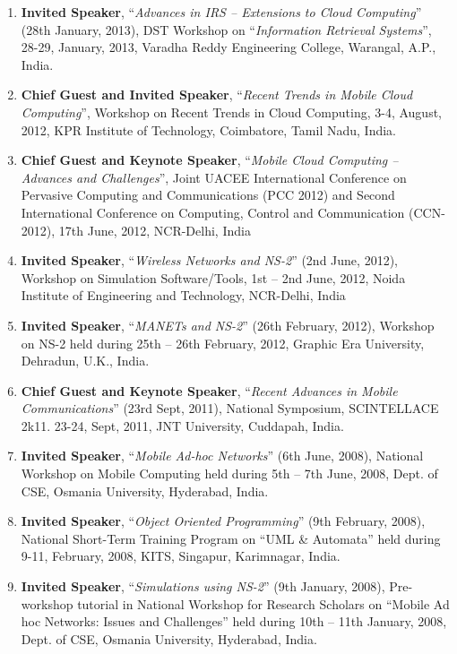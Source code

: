 \begin{enumerate}
\item
\textbf{Invited Speaker}, “\textit{Advances in IRS – Extensions to Cloud Computing}” (28th January, 2013), DST Workshop on “\textit{Information Retrieval Systems}”, 28-29, January, 2013, Varadha Reddy Engineering College, Warangal, A.P., India.

\item
\textbf{Chief Guest and Invited Speaker}, “\textit{Recent Trends in Mobile Cloud Computing}”, Workshop on Recent Trends in Cloud Computing, 3-4, August, 2012, KPR Institute of Technology, Coimbatore, Tamil Nadu, India.

\item
\textbf{Chief Guest and Keynote Speaker}, “\textit{Mobile Cloud Computing – Advances and Challenges}”, Joint UACEE International Conference on Pervasive Computing and Communications (PCC 2012) and Second International Conference on Computing, Control and Communication (CCN-2012), 17th June, 2012, NCR-Delhi, India

\item
\textbf{Invited Speaker}, “\textit{Wireless Networks and NS-2}” (2nd June, 2012), Workshop on Simulation Software/Tools, 1st – 2nd June, 2012, Noida Institute of Engineering and Technology, NCR-Delhi, India

\item
\textbf{Invited Speaker}, “\textit{MANETs and NS-2}” (26th February, 2012), Workshop on NS-2 held during 25th – 26th February, 2012, Graphic Era University, Dehradun, U.K., India.

\item
\textbf{Chief Guest and Keynote Speaker}, “\textit{Recent Advances in Mobile Communications}” (23rd Sept, 2011), National Symposium, SCINTELLACE 2k11. 23-24, Sept, 2011, JNT University, Cuddapah, India.

\item
\textbf{Invited Speaker}, “\textit{Mobile Ad-hoc Networks}” (6th June, 2008), National Workshop on Mobile Computing held during 5th – 7th June, 2008, Dept. of CSE, Osmania University, Hyderabad, India.

\item
\textbf{Invited Speaker}, “\textit{Object Oriented Programming}” (9th February, 2008), National Short-Term Training Program on “UML \& Automata” held during   9-11, February, 2008, KITS, Singapur, Karimnagar, India.

\item
\textbf{Invited Speaker}, “\textit{Simulations using NS-2}” (9th January, 2008), Pre-workshop tutorial in National Workshop for Research Scholars on “Mobile Ad hoc Networks: Issues and Challenges” held during 10th – 11th January, 2008, Dept. of CSE, Osmania University, Hyderabad, India.


\end{enumerate}
